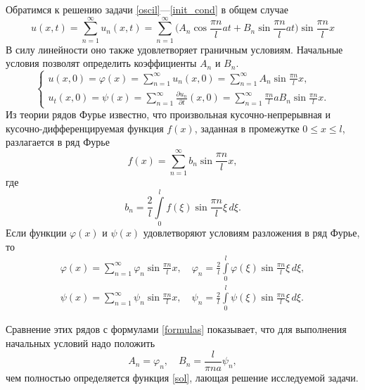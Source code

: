 	Обратимся к решению задачи \eqref{oscil}---\eqref{init_cond} в общем случае 
	\begin{equation} \label{sol}
		u(x, t) = \sum \limits_{n = 1}^{\infty} u_n(x, t) = \sum \limits_{n = 1}^{\infty} \Big(A_n \cos{\frac{\pi n}{l} a t} + B_n \sin{\frac{\pi n}{l} a t}\Big) \sin{\frac{\pi n}{l} x}
	\end{equation} 
	В силу линейности оно также удовлетворяет граничным условиям. Начальные условия позволят определить коэффициенты $A_n$ и $B_n$.
	\begin{equation} \label{formulas}
		\begin{cases}
			u(x, 0) = \varphi(x) = \sum \limits_{n = 1}^{\infty} u_n(x, 0) = \sum \limits_{n = 1}^{\infty} A_n \sin{\frac{\pi n}{l} x}, \\
			u_t(x, 0) = \psi(x) = \sum \limits_{n = 1}^{\infty} \frac{\partial u_n}{\partial t}(x, 0) = \sum \limits_{n = 1}^{\infty} \frac{\pi n}{l} a B_n \sin{\frac{\pi n}{l} x}.
		\end{cases}
	\end{equation}
	Из теории рядов Фурье известно, что произвольная кусочно-непрерывная и кусочно-дифференцируемая функция $f(x)$, заданная в промежутке $0 \leqslant x \leqslant l$, разлагается в ряд Фурье
	\begin{equation}
		f(x) = \sum \limits_{n = 1}^{\infty} b_n \sin{\frac{\pi n}{l} x},
	\end{equation}
	где
	\begin{equation}
		b_n = \frac{2}{l} \int \limits_{0}^{l} f(\xi) \sin{\frac{\pi n}{l}\xi} \, d\xi. 
	\end{equation}
	Если функции $\varphi(x)$ и $\psi(x)$ удовлетворяют условиям разложения в ряд Фурье, то
	\begin{align}
		\varphi(x) = \sum \limits_{n = 1}^{\infty} \varphi_{n} \sin{\frac{\pi n}{l} x}, \quad \varphi_n = \frac{2}{l} \int \limits_{0}^{l} \varphi(\xi) \sin{\frac{\pi n}{l} \xi} \, d\xi, \\
		\psi(x) = \sum \limits_{n = 1}^{\infty} \psi_{n} \sin{\frac{\pi n}{l} x}, \quad \psi_n = \frac{2}{l} \int \limits_{0}^{l} \psi(\xi) \sin{\frac{\pi n}{l} \xi} \, d\xi.
	\end{align}
	
	Сравнение этих рядов с формулами \eqref{formulas} показывает, что для выполнения начальных условий надо положить 
	\begin{equation}
		A_n = \varphi_n, \quad B_n = \frac{l}{\pi n a} \psi_n,
	\end{equation}
	чем полностью определяется функция \eqref{sol}, лающая решение исследуемой задачи. 